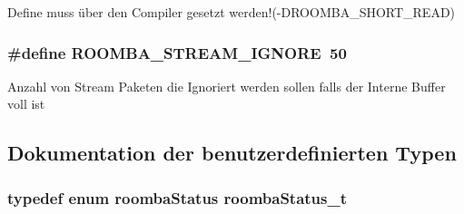 Define muss über den Compiler gesetzt werden!(-\/\-D\-R\-O\-O\-M\-B\-A\-\_\-\-S\-H\-O\-R\-T\-\_\-\-R\-E\-A\-D) \hypertarget{group__reader_ga2079001845af1fd6a4e1155bb27519c6}{
\subsubsection[{R\-O\-O\-M\-B\-A\-\_\-\-S\-T\-R\-E\-A\-M\-\_\-\-I\-G\-N\-O\-R\-E}]{\setlength{\rightskip}{0pt plus 5cm}\#define R\-O\-O\-M\-B\-A\-\_\-\-S\-T\-R\-E\-A\-M\-\_\-\-I\-G\-N\-O\-R\-E~50}}\label{group__reader_ga2079001845af1fd6a4e1155bb27519c6}
Anzahl von Stream Paketen die Ignoriert werden sollen falls der Interne Buffer voll ist 

\subsection{Dokumentation der benutzerdefinierten Typen}
\hypertarget{group__reader_gaee08b378f859db5b29b55d1c980a8df9}{
\subsubsection[{roomba\-Status\-\_\-t}]{\setlength{\rightskip}{0pt plus 5cm}typedef enum {\bf roomba\-Status} {\bf roomba\-Status\-\_\-t}}}\label{group__reader_gaee08b378f859db5b29b55d1c980a8df9}



